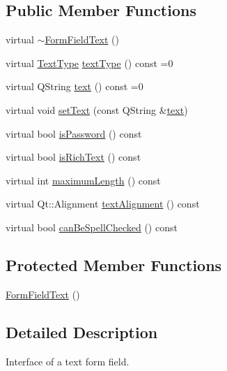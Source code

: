 \subsection*{Public Member Functions}
\begin{DoxyCompactItemize}
\item 
virtual \hyperlink{classOkular_1_1FormFieldText_a28e6d7e06e3c824269a3a7c4f7ba290c}{$\sim$\+Form\+Field\+Text} ()
\item 
virtual \hyperlink{classOkular_1_1FormFieldText_a13b763ea02b44247df564b79996671ba}{Text\+Type} \hyperlink{classOkular_1_1FormFieldText_af23fa9f5620f6b3909a064f8285348fc}{text\+Type} () const =0
\item 
virtual Q\+String \hyperlink{classOkular_1_1FormFieldText_ae81ae855ec36f258bc690a4960c93eb3}{text} () const =0
\item 
virtual void \hyperlink{classOkular_1_1FormFieldText_ab67ad787fc119bdf87281d07339e310c}{set\+Text} (const Q\+String \&\hyperlink{classOkular_1_1FormFieldText_ae81ae855ec36f258bc690a4960c93eb3}{text})
\item 
virtual bool \hyperlink{classOkular_1_1FormFieldText_ae9c7b5cbde590e6285de3a25993a5202}{is\+Password} () const 
\item 
virtual bool \hyperlink{classOkular_1_1FormFieldText_ab19c3a41187ae8d1129950c5bc03c7b7}{is\+Rich\+Text} () const 
\item 
virtual int \hyperlink{classOkular_1_1FormFieldText_a5a2cc43d03a3b4d21a68b35a48ab52ff}{maximum\+Length} () const 
\item 
virtual Qt\+::\+Alignment \hyperlink{classOkular_1_1FormFieldText_a5a089e161057983827b40ca3ca57a1b3}{text\+Alignment} () const 
\item 
virtual bool \hyperlink{classOkular_1_1FormFieldText_ae85f290a7d8cbe1a280c6129d72df561}{can\+Be\+Spell\+Checked} () const 
\end{DoxyCompactItemize}
\subsection*{Protected Member Functions}
\begin{DoxyCompactItemize}
\item 
\hyperlink{classOkular_1_1FormFieldText_a4c4633684016169c3aed297269fdcbc5}{Form\+Field\+Text} ()
\end{DoxyCompactItemize}


\subsection{Detailed Description}
Interface of a text form field. 

